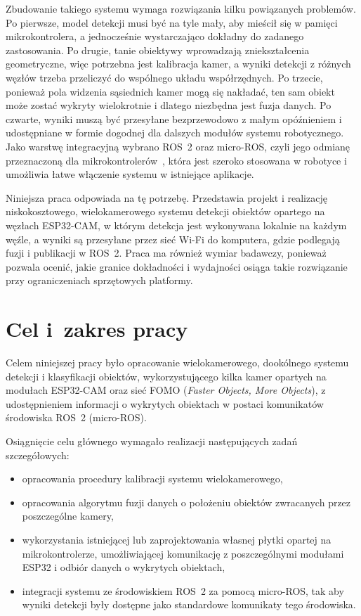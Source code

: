 Zbudowanie takiego systemu wymaga rozwiązania kilku powiązanych problemów. Po pierwsze, model detekcji musi być na tyle mały, aby mieścił się w pamięci mikrokontrolera, a jednocześnie wystarczająco dokładny do zadanego zastosowania. Po drugie, tanie obiektywy wprowadzają zniekształcenia geometryczne, więc potrzebna jest kalibracja kamer, a wyniki detekcji z różnych węzłów trzeba przeliczyć do wspólnego układu współrzędnych. Po trzecie, ponieważ pola widzenia sąsiednich kamer mogą się nakładać, ten sam obiekt może zostać wykryty wielokrotnie i dlatego niezbędna jest fuzja danych. Po czwarte, wyniki muszą być przesyłane bezprzewodowo z małym opóźnieniem i udostępniane w formie dogodnej dla dalszych modułów systemu robotycznego. Jako warstwę integracyjną wybrano ROS~2 oraz micro-ROS, czyli jego odmianę przeznaczoną dla mikrokontrolerów~\cite{TODO_ros2, TODO_microros}, która jest szeroko stosowana w robotyce i umożliwia łatwe włączenie systemu w istniejące aplikacje.

Niniejsza praca odpowiada na tę potrzebę. Przedstawia projekt i realizację niskokosztowego, wielokamerowego systemu detekcji obiektów opartego na węzłach ESP32-CAM, w którym detekcja jest wykonywana lokalnie na każdym węźle, a wyniki są przesyłane przez sieć Wi-Fi do komputera, gdzie podlegają fuzji i publikacji w ROS~2. Praca ma również wymiar badawczy, ponieważ pozwala ocenić, jakie granice dokładności i wydajności osiąga takie rozwiązanie przy ograniczeniach sprzętowych platformy.



\section{Cel i~zakres pracy}
\label{sec:celePracy}
Celem niniejszej pracy było opracowanie wielokamerowego, dookólnego systemu detekcji i klasyfikacji obiektów, wykorzystującego kilka kamer opartych na modułach ESP32-CAM oraz sieć FOMO (\textit{Faster Objects, More Objects}), z udostępnieniem informacji o wykrytych obiektach w postaci komunikatów środowiska ROS~2 (micro-ROS).

Osiągnięcie celu głównego wymagało realizacji następujących zadań szczegółowych:
\begin{itemize}
    \item opracowania procedury kalibracji systemu wielokamerowego,
    \item opracowania algorytmu fuzji danych o położeniu obiektów zwracanych przez poszczególne kamery,
    \item wykorzystania istniejącej lub zaprojektowania własnej płytki opartej na mikrokontrolerze, umożliwiającej komunikację z poszczególnymi modułami ESP32 i odbiór danych o wykrytych obiektach,
    \item integracji systemu ze środowiskiem ROS~2 za pomocą micro-ROS, tak aby wyniki detekcji były dostępne jako standardowe komunikaty tego środowiska.
\end{itemize}



